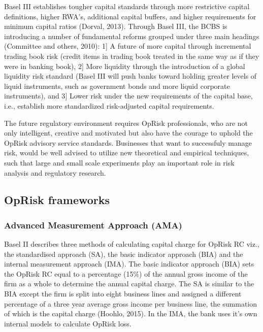 \documentclass[]{DissertateUSU}
\begin{document}
Basel III establishes tougher capital standards through more restrictive
capital definitions, higher RWA's, additional capital buffers, and
higher requirements for minimum capital ratios (Dorval, 2013). Through
Basel III, the BCBS is introducing a number of fundamental reforms
grouped under three main headings (Committee and others, 2010): 1{]} A
future of more capital through incremental trading book risk (credit
items in trading book treated in the same way as if they were in banking
book), 2{]} More liquidity through the introduction of a global
liquidity risk standard (Basel III will push banks toward holding
greater levels of liquid instruments, such as government bonds and more
liquid corporate instruments), and 3{]} Lower risk under the new
requirements of the capital base, i.e., establish more standardized
risk-adjusted capital requirements.\medskip

The future regulatory environment requires OpRisk professionals, who are
not only intelligent, creative and motivated but also have the courage
to uphold the OpRisk advisory service standards. Businesses that want to
successfuly manage risk, would be well advised to utilize new
theoretical and empirical techniques, such that large and small scale
experiments play an important role in risk analysis and regulatory
research.

\subsection{OpRisk frameworks}

\subsubsection{Advanced Measurement Approach (AMA)}

Basel II describes three methods of calculating capital charge for
OpRisk RC viz., the standardised approach (SA), the basic indicator
approach (BIA) and the internal measurement approach (IMA). The basic
indicator approach (BIA) sets the OpRisk RC equal to a percentage (15\%)
of the annual gross income of the firm as a whole to determine the
annual capital charge. The SA is similar to the BIA except the firm is
split into eight business lines and assigned a different percentage of a
three year average gross income per business line, the summation of
which is the capital charge (Hoohlo, 2015). In the IMA, the bank uses
it's own internal models to calculate OpRisk loss.\medskip
\end{document}
